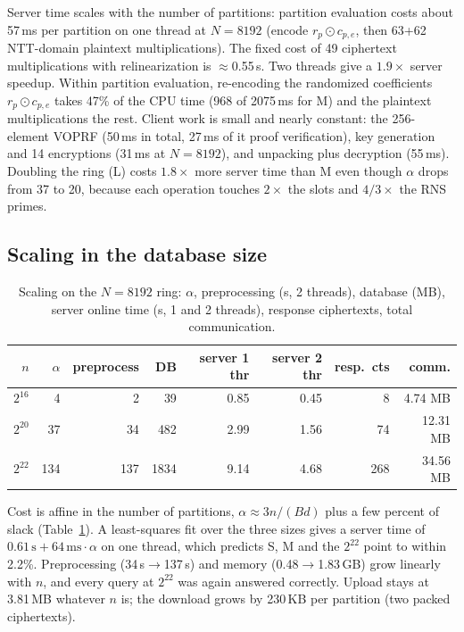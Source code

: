 \documentclass[11pt]{article}
\begin{document}
Server time scales with the number of partitions: partition evaluation costs about 57\,ms per partition on one thread at $N=8192$ (encode $r_p\odot c_{p,e}$, then 63+62 NTT-domain plaintext multiplications). The fixed cost of 49 ciphertext multiplications with relinearization is $\approx$0.55\,s. Two threads give a $1.9\times$ server speedup. Within partition evaluation, re-encoding the randomized coefficients $r_p\odot c_{p,e}$ takes 47\% of the CPU time (968 of 2075\,ms for M) and the plaintext multiplications the rest. Client work is small and nearly constant: the 256-element VOPRF (50\,ms in total, 27\,ms of it proof verification), key generation and 14 encryptions (31\,ms at $N=8192$), and unpacking plus decryption (55\,ms). Doubling the ring (L) costs $1.8\times$ more server time than M even though $\alpha$ drops from 37 to 20, because each operation touches $2\times$ the slots and $4/3\times$ the RNS primes.

\subsection{Scaling in the database size}
\begin{table}[H]
\centering\small
\caption{Scaling on the $N=8192$ ring: $\alpha$, preprocessing (s, 2 threads), database (MB), server online time (s, 1 and 2 threads), response ciphertexts, total communication.}
\label{tab:scale}
\begin{tabular}{@{}rrrrrrrr@{}}
\toprule
$n$ & $\alpha$ & preprocess & DB & server 1 thr & server 2 thr & resp.\ cts & comm. \\
\midrule
$2^{16}$ & 4 & 2 & 39 & 0.85 & 0.45 & 8 & 4.74 MB \\
$2^{20}$ & 37 & 34 & 482 & 2.99 & 1.56 & 74 & 12.31 MB \\
$2^{22}$ & 134 & 137 & 1834 & 9.14 & 4.68 & 268 & 34.56 MB \\
\bottomrule
\end{tabular}
\end{table}
Cost is affine in the number of partitions, $\alpha\approx 3n/(Bd)$ plus a few percent of slack (Table~\ref{tab:scale}). A least-squares fit over the three sizes gives a server time of $0.61\,\mathrm{s}+64\,\mathrm{ms}\cdot\alpha$ on one thread, which predicts S, M and the $2^{22}$ point to within 2.2\%. Preprocessing (34\,s$\to$137\,s) and memory (0.48$\to$1.83\,GB) grow linearly with $n$, and every query at $2^{22}$ was again answered correctly. Upload stays at 3.81\,MB whatever $n$ is; the download grows by 230\,KB per partition (two packed ciphertexts).
\end{document}
